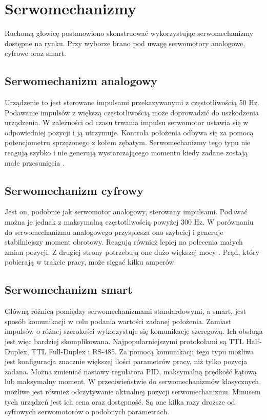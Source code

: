 \section{Serwomechanizmy}
\label{sec:serwomechanizmy}


Ruchomą głowicę postanowiono skonstruować wykorzystując serwomechanizmy dostępne na rynku. 
Przy wyborze brano pod uwagę serwomotory analogowe, cyfrowe oraz smart.

\subsection{Serwomechanizm analogowy}
Urządzenie to jest sterowane impulsami przekazywanymi z częstotliwością 50 Hz.
Podawanie impulsów z większą częstotliwością może doprowadzić do uszkodzenia urządzenia.
W zależności od czasu trwania impulsu serwomotor ustawia się w odpowiedniej pozycji i ją utrzymuje. 
Kontrola położenia odbywa się za pomocą potencjometru sprzężonego z kołem zębatym. 
Serwomechanizmy tego typu nie reagują szybko i nie generują wystarczającego momentu kiedy zadane zostają małe przesunięcia \cite{Salt}.

\subsection{Serwomechanizm cyfrowy}

Jest on, podobnie jak serwomotor analogowy, sterowany impulsami. 
Podawać można je jednak z maksymalną częstotliwością powyżej 300 Hz. 
W porównaniu do serwomechanizmu analogowego przyspiesza ono szybciej i generuje stabilniejszy moment obrotowy. 
Reagują również lepiej na polecenia małych zmian pozycji. 
Z drugiej strony potrzebują one dużo większej mocy \cite{Salt}.
Prąd, który pobierają w trakcie pracy, może sięgać kilku amperów.

\subsection{Serwomechanizm smart}
Główną różnicą pomiędzy serwomechanizmami standardowymi, a smart, jest sposób komunikacji w celu podania wartości zadanej położenia.
Zamiast impulsów o różnej szerokości wykorzystuje się komunikację szeregową.
Ich obsługa jest więc bardziej skomplikowana. Najpopularniejszymi protokołami są TTL Half-Duplex, TTL Full-Duplex i RS-485.
Za pomocą komunikacji tego typu możliwa jest konfiguracja znacznie większej ilości parametrów pracy, niż tylko pozycja zadana.
Można zmieniać nastawy regulatora PID, maksymalną prędkość kątową lub maksymalny moment. %
W przeciwieństwie do serwomechanizmów klasycznych, możliwe jest również odczytywanie aktualnej pozycji serwomechanizmu.
Minusem tych urządzeń jest ich cena oraz dostępność.
Są one kilka razy droższe od cyfrowych serwomotorów o podobnych parametrach.

